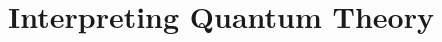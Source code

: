 \documentclass[main.tex]{subfiles}
\begin{document}
\chapter{Interpreting Quantum Theory}
\end{document}
